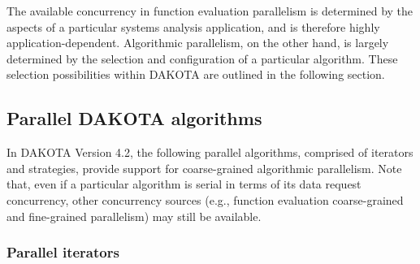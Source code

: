 The available concurrency in function evaluation parallelism is
determined by the aspects of a particular systems analysis
application, and is therefore highly application-dependent.
Algorithmic parallelism, on the other hand, is largely determined by
the selection and configuration of a particular algorithm.  These
selection possibilities within DAKOTA are outlined in the following
section.


\subsection{Parallel DAKOTA algorithms} \label{parallel:algorithms}

In DAKOTA Version 4.2, the following parallel algorithms, comprised of
iterators and strategies, provide support for coarse-grained
algorithmic parallelism.  Note that, even if a particular algorithm is
serial in terms of its data request concurrency, other concurrency
sources (e.g., function evaluation coarse-grained and fine-grained
parallelism) may still be available.

\subsubsection{Parallel iterators}\label{parallel:algorithms:iterators}

